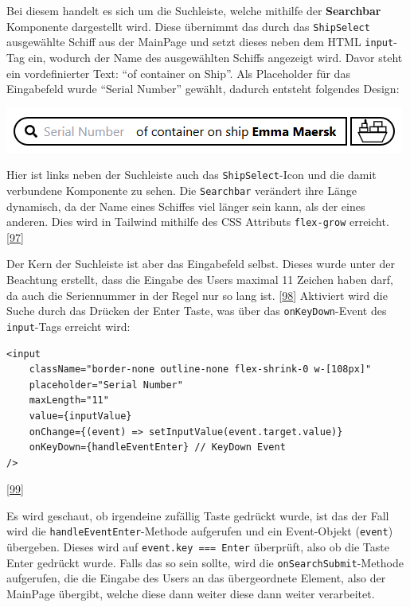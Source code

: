 \documentclass[
    headings=optiontotocandhead,%
    twoside,
    numbers=noenddot,%
    12pt, %
    titlepage, %
    parskip=full, %
    listof=leveldown, 
    numbers=noenddot, %
    a4paper,DIV=14,
    BCOR=15mm,
]{scrbook}
\newcommand{\passthrough}[1]{#1}
\let\origfigure=\figure
\let\endorigfigure=\endfigure
\renewenvironment{figure}[1][]{%
   \origfigure[H]
}{%
   \endorigfigure
}
\begin{document}
Bei diesem handelt es sich um die Suchleiste, welche mithilfe der
\textbf{Searchbar} Komponente dargestellt wird. Diese übernimmt das
durch das \passthrough{\lstinline!ShipSelect!} ausgewählte Schiff aus
der MainPage und setzt dieses neben dem HTML
\passthrough{\lstinline!input!}-Tag ein, wodurch der Name des
ausgewählten Schiffs angezeigt wird. Davor steht ein vordefinierter
Text: ``of container on Ship''. Als Placeholder für das Eingabefeld
wurde ``Serial Number'' gewählt, dadurch entsteht folgendes Design:

\begin{figure}
\centering
\includegraphics{img/Gekle/Searchbar.png}
\caption{Searchbar + ShipSelect Button}
\end{figure}

Hier ist links neben der Suchleiste auch das
\passthrough{\lstinline!ShipSelect!}-Icon und die damit verbundene
Komponente zu sehen. Die \passthrough{\lstinline!Searchbar!} verändert
ihre Länge dynamisch, da der Name eines Schiffes viel länger sein kann,
als der eines anderen. Dies wird in Tailwind mithilfe des CSS Attributs
\passthrough{\lstinline!flex-grow!} erreicht.
{[}\protect\hyperlink{ref-TailwindCSS-Docs-FlexGrow}{97}{]}

Der Kern der Suchleiste ist aber das Eingabefeld selbst. Dieses wurde
unter der Beachtung erstellt, dass die Eingabe des Users maximal 11
Zeichen haben darf, da auch die Seriennummer in der Regel nur so lang
ist. {[}\protect\hyperlink{ref-ContainerBasis-Containernummern}{98}{]}
Aktiviert wird die Suche durch das Drücken der Enter Taste, was über das
\passthrough{\lstinline!onKeyDown!}-Event des
\passthrough{\lstinline!input!}-Tags erreicht wird:

\begin{lstlisting}[caption={Inout Tag der Searchbar}]
<input
    className="border-none outline-none flex-shrink-0 w-[108px]"
    placeholder="Serial Number"
    maxLength="11"
    value={inputValue}
    onChange={(event) => setInputValue(event.target.value)}
    onKeyDown={handleEventEnter} // KeyDown Event
/>
\end{lstlisting}

{[}\protect\hyperlink{ref-Pluralsight-KeyboardEvents}{99}{]}

Es wird geschaut, ob irgendeine zufällig Taste gedrückt wurde, ist das
der Fall wird die \passthrough{\lstinline!handleEventEnter!}-Methode
aufgerufen und ein Event-Objekt (\passthrough{\lstinline!event!})
übergeben. Dieses wird auf \passthrough{\lstinline!event.key === Enter!}
überprüft, also ob die Taste Enter gedrückt wurde. Falls das so sein
sollte, wird die \passthrough{\lstinline!onSearchSubmit!}-Methode
aufgerufen, die die Eingabe des Users an das übergeordnete Element, also
der MainPage übergibt, welche diese dann weiter diese dann weiter
verarbeitet.
\end{document}
